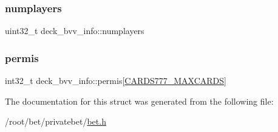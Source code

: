 \subsubsection{\texorpdfstring{numplayers}{numplayers}}
{\footnotesize\ttfamily uint32\+\_\+t deck\+\_\+bvv\+\_\+info\+::numplayers}

\mbox{\label{structdeck__bvv__info_ab8b8de70d12f184c0ac81af66ca5c083}} 
\subsubsection{\texorpdfstring{permis}{permis}}
{\footnotesize\ttfamily int32\+\_\+t deck\+\_\+bvv\+\_\+info\+::permis\mbox{[}\hyperlink{common_8h_a90f0ea2d767ac1915e44acb24a1fe1bd}{C\+A\+R\+D\+S777\+\_\+\+M\+A\+X\+C\+A\+R\+DS}\mbox{]}}



The documentation for this struct was generated from the following file\+:\begin{DoxyCompactItemize}
\item 
/root/bet/privatebet/\hyperlink{bet_8h}{bet.\+h}\end{DoxyCompactItemize}
